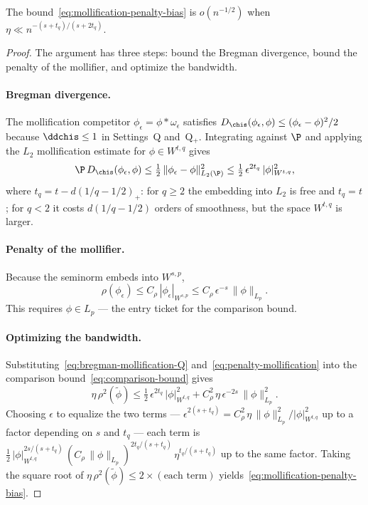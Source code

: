 \documentclass{article}
\begin{document}
The bound~\eqref{eq:mollification-penalty-bias}
is $o(n^{-1/2})$ when
$\eta \ll n^{-(s + t_q)/(s + 2t_q)}$.

\begin{proof}
The argument has three steps:
bound the Bregman divergence,
bound the penalty of the mollifier,
and optimize the bandwidth.

\paragraph{Bregman divergence.}
The mollification competitor
$\phi_\epsilon = \phi * \omega_\epsilon$
satisfies
$D_{\chis}(\phi_\epsilon, \phi)
  \le (\phi_\epsilon - \phi)^2/2$
because $\ddchis \le 1$
in Settings~Q and~Q$_+$.
Integrating against $\P$
and applying the $L_2$ mollification estimate
for $\phi \in W^{t,q}$ gives
\begin{equation}
\label{eq:bregman-mollification-Q}
\P\,D_{\chis}(\phi_\epsilon, \phi)
  \le \tfrac{1}{2}\,
  \|\phi_\epsilon - \phi\|_{L_2(\P)}^2
  \le \tfrac{1}{2}\,\epsilon^{2t_q}\,
    |\phi|_{W^{t,q}}^2,
\end{equation}
where $t_q = t - d(1/q - 1/2)_+$:
for $q \ge 2$ the embedding
into $L_2$ is free and $t_q = t$;
for $q < 2$ it costs
$d(1/q - 1/2)$ orders of smoothness,
but the space $W^{t,q}$ is larger.

\paragraph{Penalty of the mollifier.}
Because the seminorm embeds
into $W^{s,p}$,
\begin{equation}
\label{eq:penalty-mollification}
\rho(\phi_\epsilon)
  \le C_\rho\,|\phi_\epsilon|_{W^{s,p}}
  \le C_\rho\,\epsilon^{-s}\,
  \|\phi\|_{L_p}.
\end{equation}
This requires $\phi \in L_p$
--- the entry ticket
for the comparison bound.

\paragraph{Optimizing the bandwidth.}
Substituting~\eqref{eq:bregman-mollification-Q}
and~\eqref{eq:penalty-mollification}
into the comparison bound~\eqref{eq:comparison-bound}
gives
\[
\eta\,\rho^2(\tilde\phi)
  \le \tfrac{1}{2}\,\epsilon^{2t_q}\,
    |\phi|_{W^{t,q}}^2
  + C_\rho^2\,\eta\,\epsilon^{-2s}\,
    \|\phi\|_{L_p}^2.
\]
Choosing $\epsilon$
to equalize the two terms ---
$\epsilon^{2(s+t_q)}
  = C_\rho^2\,\eta\,\|\phi\|_{L_p}^2
  / |\phi|_{W^{t,q}}^2$ up to
a factor depending on $s$ and $t_q$ ---
each term is
$\tfrac{1}{2}\,
  |\phi|_{W^{t,q}}^{2s/(s+t_q)}\,
  (C_\rho\,\|\phi\|_{L_p})^{2t_q/(s+t_q)}\,
  \eta^{t_q/(s+t_q)}$
up to the same factor.
Taking the square root
of $\eta\,\rho^2(\tilde\phi)
  \le 2 \times (\text{each term})$
yields~\eqref{eq:mollification-penalty-bias}.
\end{proof}
\end{document}
